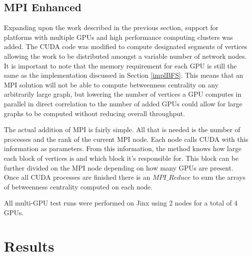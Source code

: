 \documentclass[10pt,twocolumn]{article}
\begin{document}
\subsection{MPI Enhanced}
Expanding upon the work described in the previous section, support for platforms with multiple GPUs and high performance computing clusters was added. The CUDA code was modified to compute designated segments of vertices allowing the work to be distributed amongst a variable number of network nodes. It is important to note that the memory requirement for each GPU is still the same as the implementation discussed in Section \ref{implBFS}. This means that an MPI solution will not be able to compute betweenness centrality on any arbitrarily large graph, but lowering the number of vertices a GPU computes in parallel in direct correlation to the number of added GPUs could allow for large graphs to be computed without reducing overall throughput.

The actual addition of MPI is fairly simple. All that is needed is the number of processes and the rank of the current MPI node. Each node calls CUDA with this information as parameters. From this information, the method knows how large each block of vertices is and which block it's responsible for. This block can be further divided on the MPI node depending on how many GPUs are present. Once all CUDA processes are finished there is an $MPI\_Reduce$ to sum the arrays of betweenness centrality computed on each node.

All multi-GPU test runs were performed on Jinx using 2 nodes for a total of 4 GPUs.

\section{Results}
\end{document}
